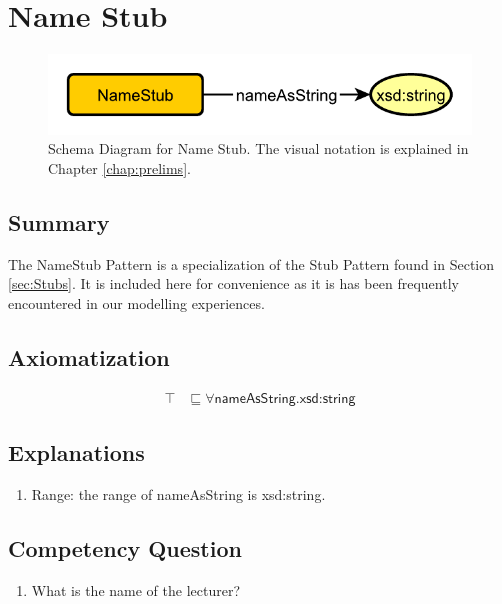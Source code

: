 \section{Name Stub}
\label{sec:Name}
\begin{figure}[h!]
\begin{center}
\includegraphics[width=.7\textwidth]{figures/name}
\end{center}
\caption{Schema Diagram for Name Stub. The visual notation is explained in Chapter \ref{chap:prelims}.}
\label{fig:Name}
\end{figure}
\subsection{Summary}
\label{sum:Name}
The \textsf{NameStub} Pattern is a specialization of the \textsf{Stub} Pattern found in Section \ref{sec:Stubs}. It is included here for convenience as it is has been frequently encountered in our modelling experiences.

\subsection{Axiomatization}
\label{axs:Name}
\begin{align}
\top &\sqsubseteq \forall \textsf{nameAsString.xsd:string} 
\end{align}

\subsection{Explanations}
\label{exp:Name}
\begin{enumerate}
\item Range: the range of \textsf{nameAsString} is \textsf{xsd:string}.
\end{enumerate}

\subsection{Competency Question}
\label{cqs:Name}
\begin{enumerate}[CQ1.]
\item What is the name of the lecturer?
\end{enumerate}

\newpage
